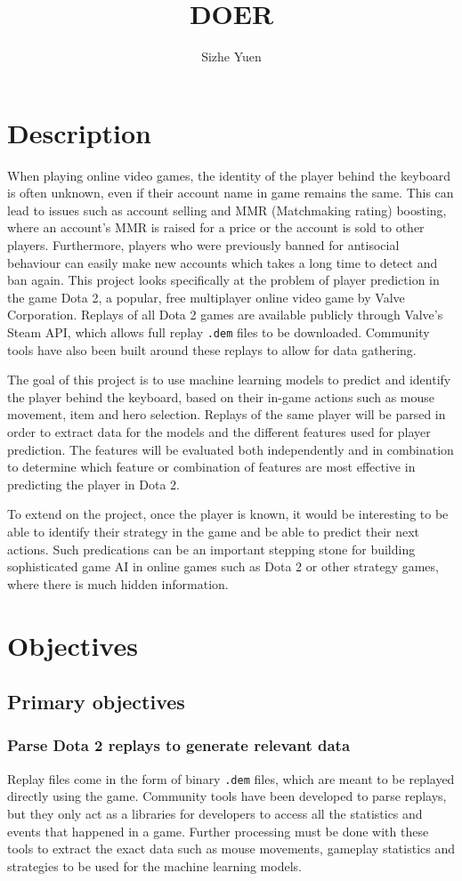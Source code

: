 \documentclass{sty/SizheArticle}
\title{DOER}
\author{Sizhe Yuen}
\newcommand{\dota}{Dota 2}
\begin{document}
\section{Description}
When playing online video games, the identity of the player behind the keyboard is often unknown, even if their account name in game remains the same. This can lead to issues such as account selling and MMR (Matchmaking rating) boosting, where an account's MMR is raised for a price or the account is sold to other players. Furthermore, players who were previously banned  for antisocial behaviour can easily make new accounts which takes a long time to detect and ban again. This project looks specifically at the problem of player prediction in the game \dota{}, a popular, free multiplayer online video game by Valve Corporation. Replays of all \dota{} games are available publicly through Valve's Steam API, which allows full replay \texttt{.dem} files to be downloaded. Community tools have also been built around these replays to allow for data gathering. 

The goal of this project is to use machine learning models to predict and identify the player behind the keyboard, based on their in-game actions such as mouse movement, item and hero selection. Replays of the same player will be parsed in order to extract data for the models and the different features used for player prediction. The features will be evaluated both independently and in combination to determine which feature or combination of features are most effective in predicting the player in \dota{}. 

To extend on the project, once the player is known, it would be interesting to be able to identify their strategy in the game and be able to predict their next actions. Such predications can be an important stepping stone for building sophisticated game AI in online games such as \dota{} or other strategy games, where there is much hidden information. 

\section{Objectives}
\subsection{Primary objectives}

\subsubsection{Parse \dota{} replays to generate relevant data}
Replay files come in the form of binary \texttt{.dem} files, which are meant to be replayed directly using the game. Community tools have been developed to parse replays, but they only act as a libraries for developers to access all the statistics and events that happened in a game. Further processing must be done with these tools to extract the exact data such as mouse movements, gameplay statistics and strategies to be used for the machine learning models. 
\end{document}
